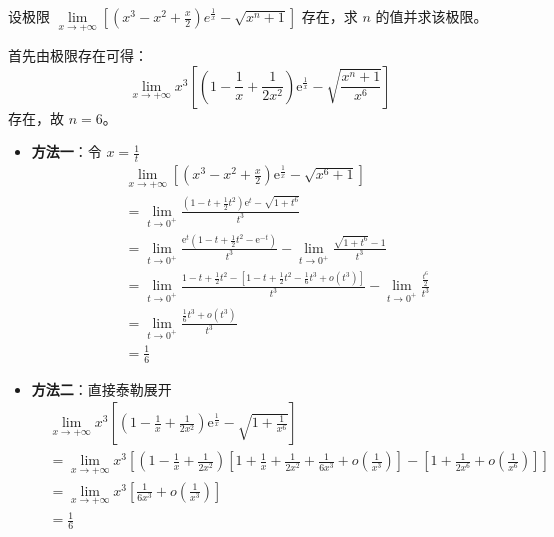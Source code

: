 \documentclass[12pt, a4paper, oneside, UTF8]{ctexbook}
\begin{document}
\begin{example}
设极限 $\lim\limits_{x\to+\infty}\left[(x^{3}-x^{2}+\frac{x}{2})e^{\frac{1}{x}}-\sqrt{x^{n}+1}\right]$ 存在，求 $n$ 的值并求该极限。
\end{example}
\begin{solution}
首先由极限存在可得：
$$ \lim _{x\rightarrow+\infty} x^{3}\left[\left(1-\frac{1}{x}+\frac{1}{2 x^{2}}\right)\mathrm{e}^{\frac{1}{x}}-\sqrt{\frac{x^{n}+1}{x^{6}}}\right] $$
存在，故 $n=6$。

\begin{itemize}
\item \textbf{方法一}：令 $x=\frac{1}{t}$
\begin{align*}
&\lim _{x\rightarrow+\infty}\left[\left(x^{3}-x^{2}+\frac{x}{2}\right)\mathrm{e}^{\frac{1}{x}}-\sqrt{x^{6}+1}\right] \\
&= \lim _{t\rightarrow 0^{+}}\frac{\left(1-t+\frac{1}{2} t^{2}\right)\mathrm{e}^{t}-\sqrt{1+t^{6}}}{t^{3}} \\
&= \lim _{t\rightarrow 0^{+}}\frac{\mathrm{e}^{t}\left(1-t+\frac{1}{2} t^{2}-\mathrm{e}^{-t}\right)}{t^{3}}-\lim _{t\rightarrow 0^{+}}\frac{\sqrt{1+t^{6}}-1}{t^{3}} \\
&= \lim _{t\rightarrow 0^{+}}\frac{1-t+\frac{1}{2} t^{2}-\left[1-t+\frac{1}{2} t^{2}-\frac{1}{6} t^{3}+o\left(t^{3}\right)\right]}{t^{3}}-\lim _{t\rightarrow 0^{+}}\frac{\frac{t^{6}}{2}}{t^{3}} \\
&= \lim _{t\rightarrow 0^{+}}\frac{\frac{1}{6} t^{3}+o\left(t^{3}\right)}{t^{3}} \\
&= \frac{1}{6}
\end{align*}

\item \textbf{方法二}：直接泰勒展开
\begin{align*}
&\lim _{x\rightarrow+\infty} x^{3}\left[\left(1-\frac{1}{x}+\frac{1}{2 x^{2}}\right)\mathrm{e}^{\frac{1}{x}}-\sqrt{1+\frac{1}{x^{6}}}\right] \\
&= \lim _{x\rightarrow+\infty} x^{3}\left[\left(1-\frac{1}{x}+\frac{1}{2 x^{2}}\right)\left[1+\frac{1}{x}+\frac{1}{2 x^{2}}+\frac{1}{6 x^{3}}+o\left(\frac{1}{x^{3}}\right)\right]-\left[1+\frac{1}{2 x^{6}}+o\left(\frac{1}{x^{6}}\right)\right]\right] \\
&= \lim _{x\rightarrow+\infty} x^{3}\left[\frac{1}{6 x^{3}}+o\left(\frac{1}{x^{3}}\right)\right] \\
&= \frac{1}{6}
\end{align*}
\end{itemize}
\end{solution}
\end{document}
